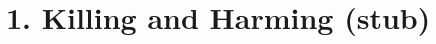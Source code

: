 \chapter{1. Killing and Harming (stub)}
\renewcommand*{\theChapterTitle}{1. Killing and Harming}

%
%
%
%
%
%
%
%
%
%
%
%
%
%
%
%
%

